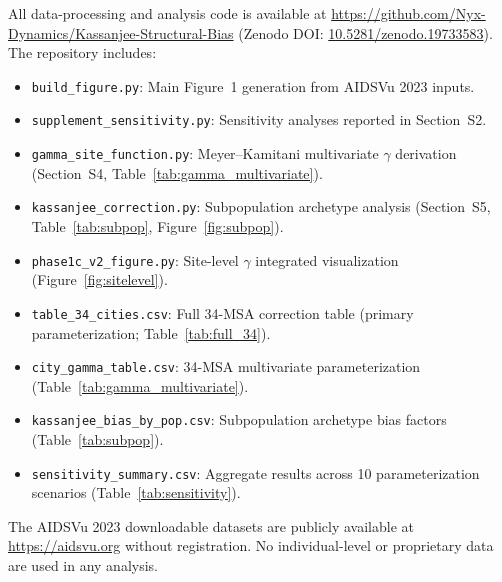 \documentclass[11pt]{article}
\begin{document}
All data-processing and analysis code is available at \url{https://github.com/Nyx-Dynamics/Kassanjee-Structural-Bias} (Zenodo DOI: \href{https://doi.org/10.5281/zenodo.19733583}{10.5281/zenodo.19733583}). The repository includes:
\begin{itemize}
\item \texttt{build\_figure.py}: Main Figure~1 generation from AIDSVu 2023 inputs.
\item \texttt{supplement\_sensitivity.py}: Sensitivity analyses reported in Section~S2.
\item \texttt{gamma\_site\_function.py}: Meyer--Kamitani multivariate $\gamma$ derivation (Section~S4, Table~\ref{tab:gamma_multivariate}).
\item \texttt{kassanjee\_correction.py}: Subpopulation archetype analysis (Section~S5, Table~\ref{tab:subpop}, Figure~\ref{fig:subpop}).
\item \texttt{phase1c\_v2\_figure.py}: Site-level $\gamma$ integrated visualization (Figure~\ref{fig:sitelevel}).
\item \texttt{table\_34\_cities.csv}: Full 34-MSA correction table (primary parameterization; Table~\ref{tab:full_34}).
\item \texttt{city\_gamma\_table.csv}: 34-MSA multivariate parameterization (Table~\ref{tab:gamma_multivariate}).
\item \texttt{kassanjee\_bias\_by\_pop.csv}: Subpopulation archetype bias factors (Table~\ref{tab:subpop}).
\item \texttt{sensitivity\_summary.csv}: Aggregate results across 10 parameterization scenarios (Table~\ref{tab:sensitivity}).
\end{itemize}
The AIDSVu 2023 downloadable datasets are publicly available at \url{https://aidsvu.org} without registration. No individual-level or proprietary data are used in any analysis.
\end{document}
